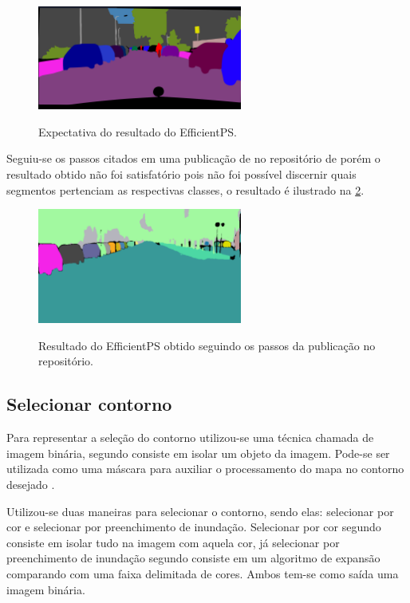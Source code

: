 \begin{figure}[!ht]
	\centering
    \caption{Expectativa do resultado do EfficientPS.}
	\includegraphics[width=0.6\textwidth]{figures/expectativa.png}
	\label{fig:expectativa}
\end{figure}

Seguiu-se os passos citados em uma publicação de  no repositório de  porém o resultado obtido não foi satisfatório pois não foi possível discernir quais segmentos pertenciam as respectivas classes, o resultado é ilustrado na \cref{fig:resultado_obtido}.

\begin{figure}[!ht]
	\centering
    \caption{Resultado do EfficientPS obtido seguindo os passos da publicação no repositório.}
	\includegraphics[width=0.6\textwidth]{figures/resultado_obtido.png}
	\label{fig:resultado_obtido}
\end{figure}

\subsection{Selecionar contorno}

Para representar a seleção do contorno utilizou-se uma técnica chamada de imagem binária, segundo  consiste em isolar um objeto da imagem. Pode-se ser utilizada como uma máscara para auxiliar o processamento do  mapa no contorno desejado \cite{Aznag2020}.

Utilizou-se duas maneiras para selecionar o contorno, sendo elas: selecionar por cor e selecionar por preenchimento de inundação. Selecionar por cor segundo  consiste em isolar tudo na imagem com aquela cor, já selecionar por preenchimento de inundação segundo  consiste em um algoritmo de expansão comparando com uma faixa delimitada de cores. Ambos tem-se como saída uma imagem binária.

